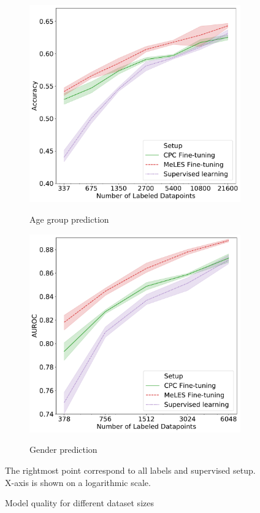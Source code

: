 \documentclass{article}
\begin{document}
\begin{figure}
\begin{subfigure}{0.5\linewidth}
    \label{fig-semi-gender-0}
  \end{subfigure}
  \begin{subfigure}{0.5\linewidth}
    \caption{Age group prediction}
    \includegraphics[width=\linewidth]{figures/ss_age_1_wopl.pdf}
    \label{fig-semi-age-1}
  \end{subfigure}%
  \begin{subfigure}{0.5\linewidth}
    \caption{Gender prediction}
    \includegraphics[width=\linewidth]{figures/ss_gen_1.pdf}
    \label{fig-semi-gender-1}
  \end{subfigure}
  \caption{Model quality for different dataset sizes} \small{The rightmost point correspond to all labels and supervised setup. X-axis is shown on a logarithmic scale.}
\end{figure}
\end{document}
